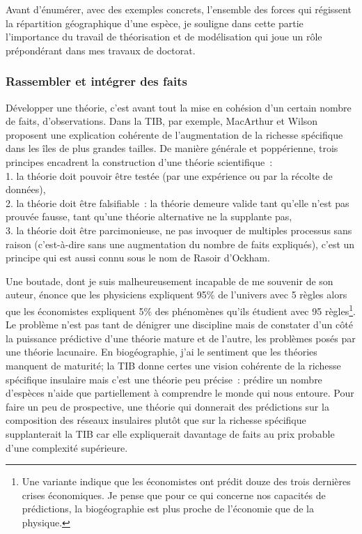 Avant d'énumérer, avec des exemples concrets, l'ensemble des forces qui
régissent la répartition géographique d'une espèce, je souligne dans
cette partie l'importance du travail de théorisation et de modélisation
qui joue un rôle prépondérant dans mes travaux de doctorat.

\subsubsection*{Rassembler et intégrer des
faits}\label{rassembler-et-intuxe9grer-des-faits}

Développer une théorie, c'est avant tout la mise en cohésion d'un
certain nombre de faits, d'observations. Dans la TIB, par exemple,
MacArthur et Wilson proposent une explication cohérente de
l'augmentation de la richesse spécifique dans les îles de plus grandes
tailles. De manière générale et poppérienne, trois principes encadrent
la construction d'une théorie scientifique~:\\
1. la théorie doit pouvoir être testée (par une expérience ou par la
récolte de données),\\
2. la théorie doit être falsifiable~: la théorie demeure valide tant
qu'elle n'est pas prouvée fausse, tant qu'une théorie alternative ne la
supplante pas,\\
3. la théorie doit être parcimonieuse, ne pas invoquer de multiples
processus sans raison (c'est-à-dire sans une augmentation du nombre de
faits expliqués), c'est un principe qui est aussi connu sous le nom de
Rasoir d'Ockham.

Une boutade, dont je suis malheureusement incapable de me souvenir de
son auteur, énonce que les physiciens expliquent 95\% de l'univers avec
5 règles alors que les économistes expliquent 5\% des phénomènes qu'ils
étudient avec 95 règles\footnote{Une variante indique que les
  économistes ont prédit douze des trois dernières crises économiques.
  Je pense que pour ce qui concerne nos capacités de prédictions, la
  biogéographie est plus proche de l'économie que de la physique.}. Le
problème n'est pas tant de dénigrer une discipline mais de constater
d'un côté la puissance prédictive d'une théorie mature et de l'autre,
les problèmes posés par une théorie lacunaire. En biogéographie, j'ai le
sentiment que les théories manquent de maturité; la TIB donne certes une
vision cohérente de la richesse spécifique insulaire mais c'est une
théorie peu précise~: prédire un nombre d'espèces n'aide que
partiellement à comprendre le monde qui nous entoure. Pour faire un peu
de prospective, une théorie qui donnerait des prédictions sur la
composition des réseaux insulaires plutôt que sur la richesse spécifique
supplanterait la TIB car elle expliquerait davantage de faits au prix
probable d'une complexité supérieure.

